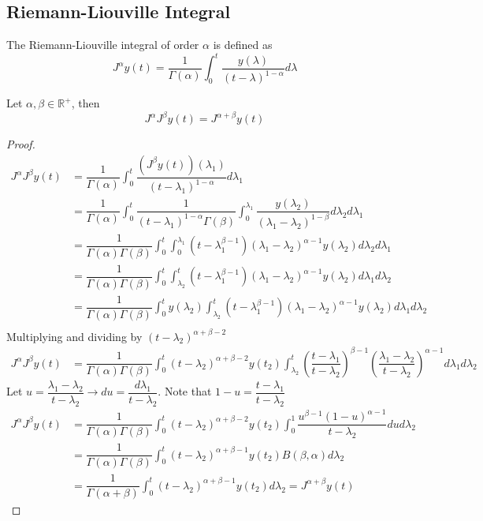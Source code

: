 \subsection{Riemann-Liouville Integral}\label{sec:RL}
The Riemann-Liouville integral of order $\alpha$ is defined as
\begin{equation}
    J^\alpha y(t) = \dfrac{1}{\Gamma(\alpha)}\int_{0}^{t}\dfrac{y(\lambda)}{(t-\lambda)^{1-\alpha}}d\lambda
\end{equation}

\begin{theorem}
Let $\alpha,\beta\in\mathbb{R}^+$, then
\begin{equation}
    J^\alpha J^\beta y(t) = J^{\alpha+\beta} y(t)
\end{equation}
\end{theorem}
\begin{proof}
\begin{align*}
    J^{\alpha}J^{\beta}y(t)&=\dfrac{1}{\Gamma(\alpha)} \int_0^t\dfrac{\left(J^{\beta}y(t)\right)(\lambda_1)}{(t-\lambda_1)^{1-\alpha}}d\lambda_1\\
    &=\dfrac{1}{\Gamma(\alpha)} \int_0^t\dfrac{1}{(t-\lambda_1)^{1-\alpha}\Gamma(\beta)}\int_0^{\lambda_1}\dfrac{y(\lambda_2)}{(\lambda_1-\lambda_2)^{1-\beta}}d\lambda_2d\lambda_1\\
    &=\dfrac{1}{\Gamma(\alpha)\Gamma(\beta)}\int_0^{t}\int_0^{\lambda_1}(t-\lambda_1^{\beta-1})(\lambda_1-\lambda_2)^{\alpha-1}y(\lambda_2)d\lambda_2d\lambda_1\\
    &=\dfrac{1}{\Gamma(\alpha)\Gamma(\beta)}\int_0^{t}\int_{\lambda_2}^t (t-\lambda_1^{\beta-1})(\lambda_1-\lambda_2)^{\alpha-1}y(\lambda_2)d\lambda_1d\lambda_2\\
    &=\dfrac{1}{\Gamma(\alpha)\Gamma(\beta)}\int_0^{t}y(\lambda_2)\int_{\lambda_2}^t(t-\lambda_1^{\beta-1})(\lambda_1-\lambda_2)^{\alpha-1}y(\lambda_2)d\lambda_1d\lambda_2\\
\end{align*}
Multiplying and dividing by $(t-\lambda_2)^{\alpha+\beta-2}$
\begin{align*}
    J^{\alpha}J^{\beta}y(t)&=\dfrac{1}{\Gamma(\alpha)\Gamma(\beta)}\int_0^{t}(t-\lambda_2)^{\alpha+\beta-2}y(t_2)\int_{\lambda_2}^{t}\left(\dfrac{t-\lambda_1}{t-\lambda_2}\right)^{\beta-1}\left(\dfrac{\lambda_1-\lambda_2}{t-\lambda_2}\right)^{\alpha-1}d\lambda_1d\lambda_2
\end{align*}
Let $u=\dfrac{\lambda_1-\lambda_2}{t-\lambda_2}\rightarrow du=\dfrac{d\lambda_1}{t-\lambda_2}$. Note that $1-u=\dfrac{t-\lambda_1}{t-\lambda_2}$
\begin{align*}
    J^{\alpha}J^{\beta}y(t)&=\dfrac{1}{\Gamma(\alpha)\Gamma(\beta)}\int_0^{t}(t-\lambda_2)^{\alpha+\beta-2}y(t_2)\int_0^1\dfrac{u^{\beta-1}(1-u)^{\alpha-1}}{t-\lambda_2}dud\lambda_2\\
    &=\dfrac{1}{\Gamma(\alpha)\Gamma(\beta)}\int_0^{t}(t-\lambda_2)^{\alpha+\beta-1}y(t_2)B(\beta,\alpha)d\lambda_2\\
    &=\dfrac{1}{\Gamma(\alpha+\beta)}\int_0^{t}(t-\lambda_2)^{\alpha+\beta-1}y(t_2)d\lambda_2=J^{\alpha+\beta}y(t)
\end{align*}
\end{proof}



